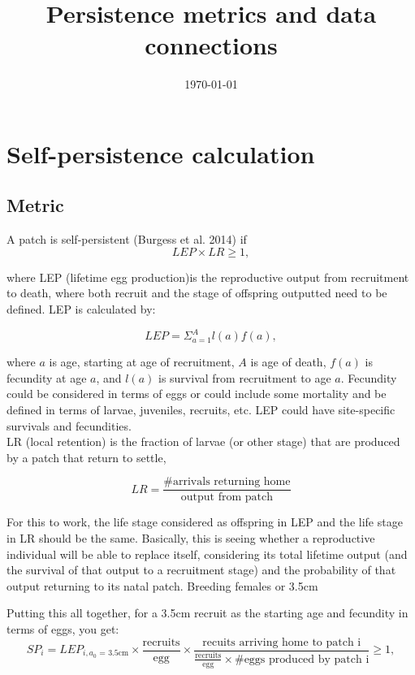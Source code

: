\documentclass[12pt, oneside]{article}   	%
\title{Persistence metrics and data connections}
\begin{document}
\date{\today}
\maketitle{}
\section{Self-persistence calculation}
\subsection*{Metric}
A patch is self-persistent (Burgess et al. 2014) if
\begin{equation}
LEP \times LR \geq 1,
\end{equation}

where LEP (lifetime egg production)is the reproductive output from recruitment to death, where both recruit and the stage of offspring outputted need to be defined. LEP is calculated by:

\begin{equation}
LEP = \Sigma_{a = 1}^{A} l(a)f(a),
\end{equation}

where $a$ is age, starting at age of recruitment, $A$ is age of death, $f(a)$ is fecundity at age $a$, and $l(a)$ is survival from recruitment to age $a$. Fecundity could be considered in terms of eggs or could include some mortality and be defined in terms of larvae, juveniles, recruits, etc. LEP could have site-specific survivals and fecundities.\\ %

LR (local retention) is the fraction of larvae (or other stage) that are produced by a patch that return to settle,

\begin{equation}
LR = \frac{\text{\# arrivals returning home}}{\text{output from patch}}
\end{equation}

For this to work, the life stage considered as offspring in LEP and the life stage in LR should be the same. Basically, this is seeing whether a reproductive individual will be able to replace itself, considering its total lifetime output (and the survival of that output to a recruitment stage) and the probability of that output returning to its natal patch. Breeding females or 3.5cm 

Putting this all together, for a 3.5cm recruit as the starting age and fecundity in terms of eggs, you get:
\begin{equation}
SP_i = LEP_{i, \text{$a_0$ = 3.5cm}} \times \frac{\text{recruits}}{\text{egg}} \times \frac{\text{recuits arriving home to patch i}}{\frac{\text{recruits}}{\text{egg}} \times \# \text{eggs produced by patch i}} \geq 1, 
\end{equation}
\end{document}
